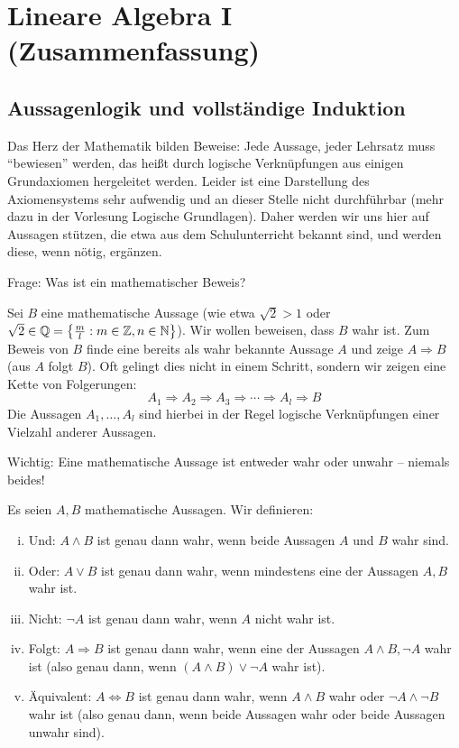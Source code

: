 \section{Lineare Algebra I (Zusammenfassung)} %
\label{cha:1}
\subsection{Aussagenlogik und vollständige Induktion}
\label{sec:1.1}
	Das Herz der Mathematik bilden Beweise:
	Jede Aussage, jeder Lehrsatz muss \enquote{bewiesen} werden, das heißt durch logische Verknüpfungen aus einigen Grundaxiomen hergeleitet werden.
	Leider ist eine Darstellung des Axiomensystems sehr aufwendig und an dieser Stelle nicht durchführbar (mehr dazu in der Vorlesung Logische Grundlagen).
	Daher werden wir uns hier auf Aussagen stützen, die etwa aus dem Schulunterricht bekannt sind, und werden diese, wenn nötig, ergänzen.
	
	Frage: Was ist ein mathematischer Beweis?
	
	Sei $B$ eine mathematische Aussage (wie etwa $\sqrt{2} > 1$ oder $\sqrt{2} \in \mathbb{Q} = \left\{\frac{m}{l} : m \in \mathbb{Z}, n \in \mathbb{N}\right\}$).
	Wir wollen beweisen, dass $B$ wahr ist.
	Zum Beweis von $B$ finde eine bereits als wahr bekannte Aussage $A$ und zeige $A \Rightarrow B$ (aus $A$ folgt $B$).
	Oft gelingt dies nicht in einem Schritt, sondern wir zeigen eine Kette von Folgerungen:
	\[
		A_1 \Rightarrow A_2 \Rightarrow A_3 \Rightarrow \cdots \Rightarrow A_l \Rightarrow B
	\]
	Die Aussagen $A_1,\dots,A_l$ sind hierbei in der Regel logische Verknüpfungen einer Vielzahl anderer Aussagen.
	
	Wichtig: Eine mathematische Aussage ist entweder wahr oder unwahr -- niemals beides!
	
\begin{definition}
	\label{def:I.1.1}
	Es seien $A,B$ mathematische Aussagen. 
	Wir definieren:
	\begin{enumerate}[(i)]
		\item Und: $A \wedge B$ ist genau dann wahr, wenn beide Aussagen $A$ und $B$ wahr sind.
		\item Oder: $A \vee B$ ist genau dann wahr, wenn mindestens eine der Aussagen $A,B$ wahr ist.
		\item Nicht: $\neg A$ ist genau dann wahr, wenn $A$ nicht wahr ist.
		\item Folgt: $A \Rightarrow B$ ist genau dann wahr, wenn eine der Aussagen $A \wedge B, \neg A$ wahr ist (also genau dann, wenn $(A \wedge B) \vee \neg A$ wahr ist).
		\item Äquivalent: $A \Leftrightarrow B$ ist genau dann wahr, wenn $A \wedge B$ wahr oder $\neg A \wedge \neg B$ wahr ist (also genau dann, wenn beide Aussagen wahr oder beide Aussagen unwahr sind).
	\end{enumerate}
\end{definition}

